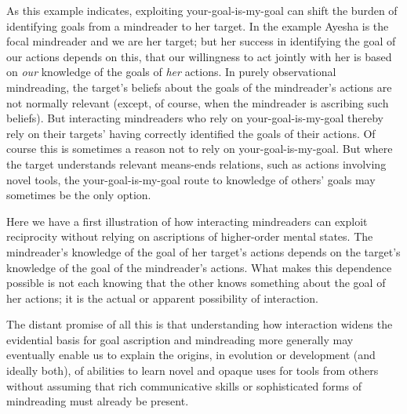 \documentclass[12pt,a4paper]{extarticle}
\begin{document}
As this example indicates,
exploiting your-goal-is-my-goal 
can shift the burden of identifying goals from a mindreader to her target.
In the example Ayesha is the focal mindreader and we are her target;
but her success in identifying the goal of our actions
depends on this,
that our willingness to act jointly with her is based on \emph{our} knowledge of the goals of \emph{her} actions.
In purely observational mindreading, the target's beliefs about the goals of the mindreader's actions are not normally relevant (except, of course, when the mindreader is ascribing such beliefs).
But interacting mindreaders who rely on your-goal-is-my-goal
thereby rely on their targets' having correctly identified the goals of their actions.
Of course this is sometimes a reason not to rely on your-goal-is-my-goal.
But where the target understands relevant means-ends relations,
such as actions involving novel tools,
the your-goal-is-my-goal route to knowledge of others' goals may sometimes be the only option.

Here we have a first illustration of how
interacting mindreaders can exploit reciprocity 
without relying on ascriptions of higher-order mental states.
The mindreader's knowledge of the goal of her target's actions depends on the target's knowledge of the goal of the mindreader's actions.
What makes this dependence possible is not each knowing that the other knows something about the goal of her actions;
 it is  the actual or apparent  possibility of interaction.

The distant promise of all this is that 
understanding how interaction widens the evidential basis for goal ascription and mindreading more generally 
may eventually enable us to explain
the origins, in evolution or development (and ideally both), of abilities to learn novel and opaque uses for tools from others 
without assuming that 
rich communicative skills
or 
sophisticated forms of mindreading 
must already be  present.
\end{document}

